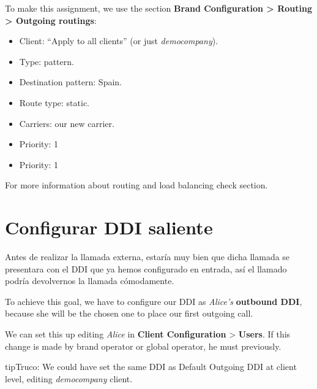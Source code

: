 \documentclass[letterpaper,10pt,spanish]{sphinxmanual}
\begin{document}
To make this assignment, we use the section \textbf{Brand Configuration \textgreater{} Routing \textgreater{} Outgoing routings}:
\begin{itemize}
\item {} 
Client: ``Apply to all clients'' (or just \emph{democompany}).

\item {} 
Type: pattern.

\item {} 
Destination pattern: Spain.

\item {} 
Route type: static.

\item {} 
Carriers: our new carrier.

\item {} 
Priority: 1

\item {} 
Priority: 1

\end{itemize}

For more information about routing and load balancing check {\hyperref[administration_portal/brand/routing/outgoing_routings:outgoing\string-routings]{}} section.


\section{Configurar DDI saliente}
\label{getting_started/external_outgoing_calls/outgoing_ddi:external-ddi}\label{getting_started/external_outgoing_calls/outgoing_ddi::doc}\label{getting_started/external_outgoing_calls/outgoing_ddi:outgoing-ddi-configuration}
Antes de realizar la llamada externa, estaría muy bien que dicha llamada se presentara con el DDI que ya hemos configurado en entrada, así el llamado podría devolvernos la llamada cómodamente.

To achieve this goal, we have to configure our DDI as \emph{Alice's} \textbf{outbound DDI},
because she will be the chosen one to place our first outgoing call.

We can set this up editing \emph{Alice} in \textbf{Client Configuration} \textgreater{} \textbf{Users}. If
this change is made by brand operator or global operator, he must {\hyperref[getting_started/internal_calls/brand_portal:emulate\string-client]{}} previously.

\begin{notice}{tip}{Truco:}
We could have set the same DDI as Default Outgoing DDI at client level, editing \emph{democompany} client.
\end{notice}
\end{document}
